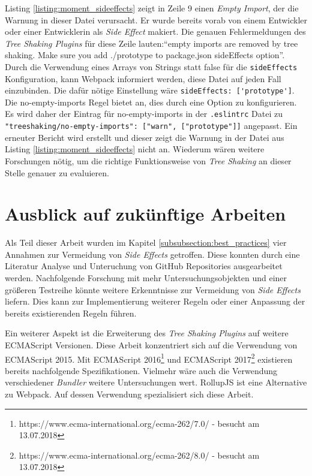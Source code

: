 Listing \ref{listing:moment_sideeffects} zeigt in Zeile 9 einen \textit{Empty Import}, der die Warnung in dieser Datei verursacht. Er wurde bereits vorab von einem Entwickler oder einer Entwicklerin als \textit{Side Effect} makiert. Die genauen Fehlermeldungen des \textit{Tree Shaking Plugins} für diese Zeile lauten:``empty imports are removed by tree shaking. Make sure you add ./prototype to package.json sideEffects option''. Durch die Verwendung eines Arrays von Strings statt false für die \lstinline{sideEffects} Konfiguration, kann Webpack informiert werden, diese Datei auf jeden Fall einzubinden. Die dafür nötige Einstellung wäre \lstinline{sideEffects: ['prototype']}. Die no-empty-imports Regel bietet an, dies durch eine Option zu konfigurieren. Es wird daher der Eintrag für no-empty-imports in der \lstinline{.eslintrc} Datei zu \lstinline{"treeshaking/no-empty-imports": ["warn", ["prototype"]]} angepasst. Ein erneuter Bericht wird erstellt und dieser zeigt die Warnung in der Datei aus Listing \ref{listing:moment_sideeffects} nicht an. Wiederum wären weitere Forschungen nötig, um die richtige Funktionsweise von \textit{Tree Shaking} an dieser Stelle genauer zu evaluieren.

\section{Ausblick auf zukünftige Arbeiten}

Als Teil dieser Arbeit wurden im Kapitel \ref{subsubsection:best_practices} vier Annahmen zur Vermeidung von \textit{Side Effects} getroffen. Diese konnten durch eine Literatur Analyse und Unteruchung von GitHub Repositories ausgearbeitet werden. Nachfolgende Forschung mit mehr Untersuchungsobjekten und einer größeren Testreihe könnte weitere Erkenntnisse zur Vermeidung von \textit{Side Effects} liefern. Dies kann zur Implementierung weiterer Regeln oder einer Anpassung der bereits existierenden Regeln führen.

Ein weiterer Aspekt ist die Erweiterung des \textit{Tree Shaking Plugins} auf weitere ECMAScript Versionen. Diese Arbeit konzentriert sich auf die Verwendung von ECMAScript 2015. Mit ECMAScript 2016\footnote{https://www.ecma-international.org/ecma-262/7.0/ - besucht am 13.07.2018} und ECMAScript 2017\footnote{https://www.ecma-international.org/ecma-262/8.0/ - besucht am 13.07.2018} existieren bereits nachfolgende Spezifikationen. Vielmehr wäre auch die Verwendung verschiedener \textit{Bundler} weitere Untersuchungen wert. RollupJS ist eine Alternative zu Webpack. Auf dessen Verwendung spezialisiert sich diese Arbeit.


